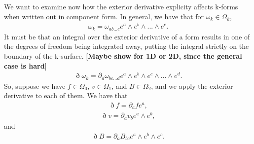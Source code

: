 \documentclass{book}
\begin{document}
We want to examine now how the exterior derivative explicity affects k-forms when written out in component form. In general, we have that for $\omega_k \in \Omega_k$, \begin{gather}\omega_k = \omega_{ab...c}e^a\wedge e^b \wedge ... \wedge e^c.\end{gather} It must be that an integral over the exterior derivative of a form results in one of the degrees of freedom being integrated away, putting the integral strictly on the boundary of the k-surface. [\textbf{Maybe show for 1D or 2D, since the general case is hard}]\begin{gather} \eth \omega_k = \partial_a\omega_{bc...d}e^a\wedge e^b\wedge e^c\wedge ... \wedge e^d.\end{gather} So, suppose we have $f \in \Omega_0$, $v \in \Omega_1$, and $B \in \Omega_2$, and we apply the exterior derivative to each of them. We have that \begin{gather}\eth f = \partial_a f e^a,\end{gather} \begin{gather}\eth v = \partial_a v_b e^a \wedge e^b,\end{gather} and \begin{gather}\eth B = \partial_a B_{bc} e^a\wedge e^b \wedge e^c.\end{gather} 
\end{document}
